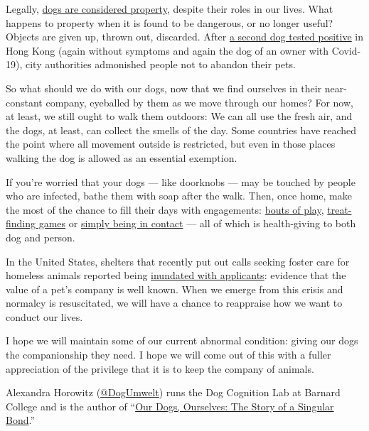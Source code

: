 Legally,
\href{https://www.theglobeandmail.com/opinion/article-when-it-comes-to-dogs-we-shouldnt-call-ourselves-owners/}{dogs
are considered property}, despite their roles in our lives. What happens
to property when it is found to be dangerous, or no longer useful?
Objects are given up, thrown out, discarded. After
\href{https://www.marketwatch.com/story/second-dog-tests-positive-for-coronavirus-as-owners-warned-not-to-abandon-pets-2020-03-20}{a
second dog tested positive} in Hong Kong (again without symptoms and
again the dog of an owner with Covid-19), city authorities admonished
people not to abandon their pets.

So what should we do with our dogs, now that we find ourselves in their
near-constant company, eyeballed by them as we move through our homes?
For now, at least, we still ought to walk them outdoors: We can all use
the fresh air, and the dogs, at least, can collect the smells of the
day. Some countries have reached the point where all movement outside is
restricted, but even in those places walking the dog is allowed as an
essential exemption.

If you're worried that your dogs --- like doorknobs --- may be touched
by people who are infected, bathe them with soap after the walk. Then,
once home, make the most of the chance to fill their days with
engagements: \href{https://doi.org/10.1007/s10071-016-0976-3}{bouts of
play},
\href{https://doi.org/10.1016/j.applanim.2018.12.009}{treat-finding
games} or \href{https://doi.org/10.3389/fpsyg.2017.01796}{simply being
in contact} --- all of which is health-giving to both dog and person.

In the United States, shelters that recently put out calls seeking
foster care for homeless animals reported being
\href{https://www.nytimes3xbfgragh.onion/2020/03/19/us/coronavirus-foster-pets.html}{inundated
with applicants}: evidence that the value of a pet's company is well
known. When we emerge from this crisis and normalcy is resuscitated, we
will have a chance to reappraise how we want to conduct our lives.

I hope we will maintain some of our current abnormal condition: giving
our dogs the companionship they need. I hope we will come out of this
with a fuller appreciation of the privilege that it is to keep the
company of animals.

Alexandra Horowitz
(\href{https://twitter.com/DogUmwelt?ref_src=twsrc\%5Egoogle\%7Ctwcamp\%5Eserp\%7Ctwgr\%5Eauthor}{@DogUmwelt})
runs the Dog Cognition Lab at Barnard College and is the author of
``\href{https://www.simonandschuster.com/books/Our-Dogs-Ourselves/Alexandra-Horowitz/9781501175008}{Our
Dogs, Ourselves: The Story of a Singular Bond}.''

